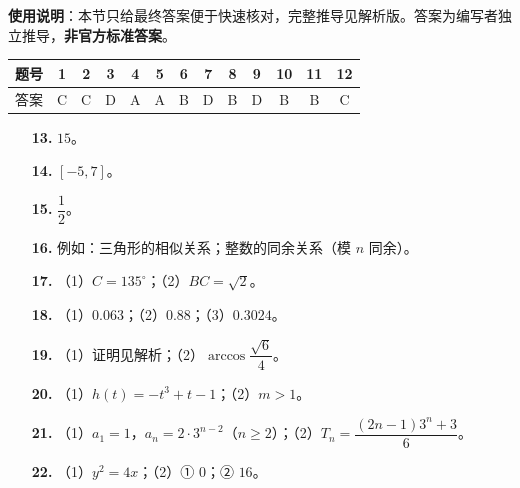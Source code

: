 
\begin{gknotice}
\textbf{使用说明}：本节只给最终答案便于快速核对，完整推导见解析版。答案为编写者独立推导，\textbf{非官方标准答案}。
\end{gknotice}

\begin{center}\begin{tabular}{ccccccccccccc}
\toprule
题号 & 1 & 2 & 3 & 4 & 5 & 6 & 7 & 8 & 9 & 10 & 11 & 12 \\
\midrule
答案 & C & C & D & A & A & B & D & B & D & B & B & C \\
\bottomrule
\end{tabular}\end{center}

\begin{itemize}[leftmargin=2.6em]
  \item[\textbf{13.}] $15$。
  \item[\textbf{14.}] $[-5,7]$。
  \item[\textbf{15.}] $\dfrac12$。
  \item[\textbf{16.}] 例如：三角形的相似关系；整数的同余关系（模 $n$ 同余）。
\end{itemize}

\begin{itemize}[leftmargin=2.6em]
  \item[\textbf{17.}] （1）$C=135^\circ$；（2）$BC=\sqrt2$。
  \item[\textbf{18.}] （1）$0.063$；（2）$0.88$；（3）$0.3024$。
  \item[\textbf{19.}] （1）证明见解析；（2）$\arccos\dfrac{\sqrt6}4$。
  \item[\textbf{20.}] （1）$h(t)=-t^3+t-1$；（2）$m>1$。
  \item[\textbf{21.}] （1）$a_1=1$，$a_n=2\cdot3^{n-2}$（$n\geqslant2$）；（2）$T_n=\dfrac{(2n-1)3^n+3}6$。
  \item[\textbf{22.}] （1）$y^2=4x$；（2）① $0$；② $16$。
\end{itemize}
